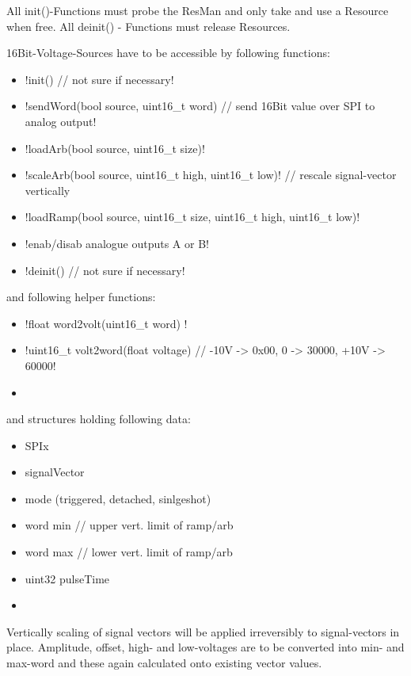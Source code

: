 	{ All init()-Functions must probe the ResMan and only take and use a Resource when free. All deinit() - Functions must release Resources.}

	{	16Bit-Voltage-Sources have to be accessible by following functions:
		\begin{itemize}
		\item 	\lstC !init() // not sure if necessary!
		\item 	\lstC !sendWord(bool source, uint16_t word)		// send 16Bit value over SPI to analog output!
		\item 	\lstC !loadArb(bool source, uint16_t size)!
		\item 	\lstC !scaleArb(bool source, uint16_t high, uint16_t low)! // rescale signal-vector vertically
		\item 	\lstC !loadRamp(bool source, uint16_t size, uint16_t high, uint16_t low)!
		\item 	\lstC !enab/disab analogue outputs A or B!
		\item 	\lstC !deinit() // not sure if necessary!
		\end{itemize}

		and following helper functions:
		\begin{itemize} \setlength\itemsep{1px}
			\item 	\lstC !float word2volt(uint16_t word) !
			\item 	\lstC !uint16_t	volt2word(float voltage) // -10V -> 0x00, 0 -> 30000, +10V -> 60000!
		\item 
		\end{itemize}

		and structures holding following data:
		\begin{itemize} \setlength\itemsep{1px}
		\item SPIx
		\item signalVector
		\item mode (triggered, detached, sinlgeshot)
		\item word min // upper vert. limit of ramp/arb
		\item word max // lower vert. limit of ramp/arb
		\item uint32	pulseTime
		\item 
		\end{itemize}
		
	}

	{	Vertically scaling of signal vectors will be applied irreversibly to signal-vectors in place.
		Amplitude, offset, high- and low-voltages are to be converted into min- and max-word and these again calculated onto existing vector values.
	}

